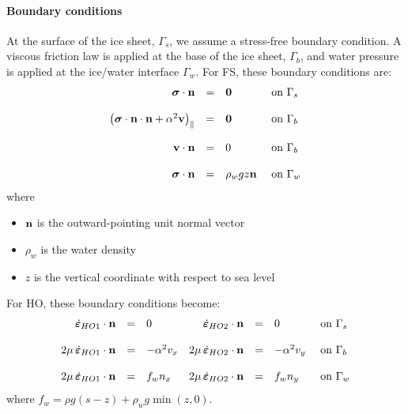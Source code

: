 \paragraph{Boundary conditions}
At the surface of the ice sheet, $\Gamma_s$, we assume a stress-free boundary condition. A viscous friction law is applied at the base of the ice sheet, $\Gamma_b$, and water pressure is applied at the ice/water interface $\Gamma_w$. For FS, these boundary conditions are:
\begin{equation}
	\begin{array}{rcll}
		\boldsymbol{\sigma}\cdot {\bf n} & = & \boldsymbol{0} & \text{ on } \Gamma_s\\
		\\
		\left(\boldsymbol{\sigma}\cdot {\bf n} \cdot {\bf n} + {\alpha}^2 {\bf v}\right)_{\parallel} & = & \boldsymbol{0} & \text{ on } \Gamma_b\\
		\\
		{\bf v} \cdot {\bf n}  & = & 0 & \text{ on } \Gamma_b\\
		\\
		\boldsymbol{\sigma}\cdot {\bf n} & = & \rho_w g z {\bf n} & \text{ on } \Gamma_w
	\end{array}
\end{equation}
where
\begin{itemize}
	\item ${\bf n}$ is the outward-pointing unit normal vector
	\item $\rho_w$ is the water density
	\item $z$ is the vertical coordinate with respect to sea level
\end{itemize}

For HO, these boundary conditions become:
\begin{equation}
	\begin{array}{rclrcll}
		\dot{\boldsymbol{\varepsilon}}_{HO1} \cdot {\bf n} & = & 0 &
		\dot{\boldsymbol{\varepsilon}}_{HO2} \cdot {\bf n} & = & 0 &
		\text{ on } \Gamma_s\\
		\\
		2\mu\,\dot{\boldsymbol{\varepsilon}}_{HO1} \cdot {\bf n} & = & -\alpha^2 v_x &
		2\mu\,\dot{\boldsymbol{\varepsilon}}_{HO2} \cdot {\bf n} & = & -\alpha^2 v_y &
		\text{ on } \Gamma_b\\
		\\
		2\mu\,\dot{\boldsymbol{\varepsilon}}_{HO1} \cdot {\bf n} & = & f_w n_x &
		2\mu\,\dot{\boldsymbol{\varepsilon}}_{HO2} \cdot {\bf n} & = & f_w n_y &
		\text{ on } \Gamma_w
	\end{array}
\end{equation}
where $f_w=\rho g\left(s-z\right) +\rho_w g \min\left(z,0\right)$.

